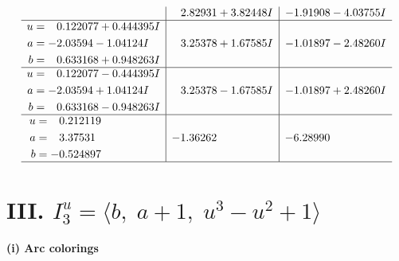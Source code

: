 \documentclass[1p]{elsarticle_modified}
\theoremstyle{definition}
\begin{document}
$$\begin{array}{c|c|c}
 & \phantom{-}2.82931 + 3.82448 I & -1.91908 - 4.03755 I \\ \hline\begin{aligned}
u &= \phantom{-}0.122077 + 0.444395 I \\
a &= -2.03594 - 1.04124 I \\
b &= \phantom{-}0.633168 + 0.948263 I\end{aligned}
 & \phantom{-}3.25378 + 1.67585 I & -1.01897 - 2.48260 I \\ \hline\begin{aligned}
u &= \phantom{-}0.122077 - 0.444395 I \\
a &= -2.03594 + 1.04124 I \\
b &= \phantom{-}0.633168 - 0.948263 I\end{aligned}
 & \phantom{-}3.25378 - 1.67585 I & -1.01897 + 2.48260 I \\ \hline\begin{aligned}
u &= \phantom{-}0.212119\phantom{ +0.000000I} \\
a &= \phantom{-}3.37531\phantom{ +0.000000I} \\
b &= -0.524897\phantom{ +0.000000I}\end{aligned}
 & -1.36262\phantom{ +0.000000I} & -6.28990\phantom{ +0.000000I}\\
 \hline 
 \end{array}$$\newpage\newpage\renewcommand{\arraystretch}{1}
\centering \section*{III. $I^u_{3}= \langle b,\;a+1,\;u^3- u^2+1 \rangle$}
\flushleft \textbf{(i) Arc colorings}\\
\end{document}

